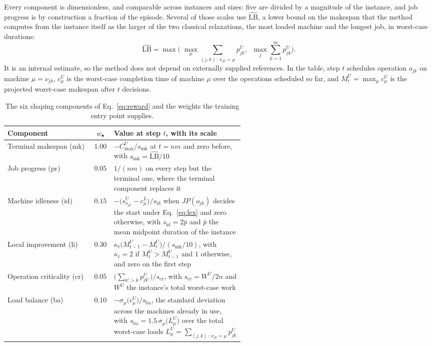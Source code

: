 \documentclass[preprint,12pt]{elsarticle}
\newcommand{\LBi}{\widehat{\mathrm{LB}}}
\theoremstyle{definition}
\theoremstyle{remark}
\begin{document}
Every component is dimensionless, and comparable across instances and
sizes: five are divided by a magnitude of the instance, and job
progress is by construction a fraction of the episode. Several of
those scales use $\LBi$, a lower bound on the makespan that the
method computes from the instance itself as the larger of the two
classical relaxations, the most loaded machine and the longest job,
in worst-case durations:
\begin{equation*}
\LBi=\max\Big(\;\max_{\mu}\sum_{(j,k)\,:\,\nu_{jk}=\mu} p^{U}_{jk},
\;\;\max_{j}\sum_{k=1}^{m} p^{U}_{jk}\Big).
\end{equation*}
It is an internal estimate, so the method does not depend on
externally supplied references. In the table, step $t$ schedules
operation $o_{jk}$ on machine $\mu=\nu_{jk}$, $c^{U}_{\mu}$ is the
worst-case completion time of machine $\mu$ over the operations
scheduled so far, and $M^{U}_{t}=\max_{\mu}c^{U}_{\mu}$ is the
projected worst-case makespan after $t$ decisions.

\begin{table}[t]
\centering\small
\caption{The six shaping components of Eq.~\eqref{eq:reward} and the
weights the training entry point supplies.}
\label{tab:reward}
\setlength{\tabcolsep}{4pt}
\renewcommand{\arraystretch}{1.2}
\begin{tabular}{@{}lcp{0.55\linewidth}@{}}
\toprule
Component & $w_{\bullet}$ & Value at step $t$, with its scale \\
\midrule
Terminal makespan (mk) & $1.00$ &
$-C^{U}_{\max}/s_{\mathrm{mk}}$ at $t=nm$ and zero before, with
$s_{\mathrm{mk}}=\LBi/10$ \\
Job progress (pr) & $0.05$ &
$1/(nm)$ on every step but the terminal one, where the terminal
component replaces it \\
Machine idleness (id) & $0.15$ &
$-\big(s^{U}_{o_{jk}}-c^{L}_{\mu}\big)/s_{\mathrm{id}}$ when
$JP(o_{jk})$ decides the start under Eq.~\eqref{eq:lex} and zero
otherwise, with $s_{\mathrm{id}}=2\bar p$ and $\bar p$ the mean
midpoint duration of the instance \\
Local improvement (li) & $0.30$ &
$\kappa_{t}\big(M^{U}_{t-1}-M^{U}_{t}\big)\big/(s_{\mathrm{mk}}/10)$,
with $\kappa_{t}=2$ if $M^{U}_{t}>M^{U}_{t-1}$ and $1$ otherwise,
and zero on the first step \\
Operation criticality (cr) & $0.05$ &
$\big(\sum_{k'>k}p^{U}_{jk'}\big)/s_{\mathrm{cr}}$, with
$s_{\mathrm{cr}}=W^{U}/2n$ and $W^{U}$ the instance's total
worst-case work \\
Load balance (ba) & $0.10$ &
$-\sigma_{\mu}\big(c^{U}_{\mu}\big)/s_{\mathrm{ba}}$, the standard
deviation across the machines already in use, with
$s_{\mathrm{ba}}=1.5\,\sigma_{\mu}\big(L^{U}_{\mu}\big)$ over the
total worst-case loads
$L^{U}_{\mu}=\sum_{(j,k)\,:\,\nu_{jk}=\mu}p^{U}_{jk}$ \\
\bottomrule
\end{tabular}
\end{table}
\end{document}
